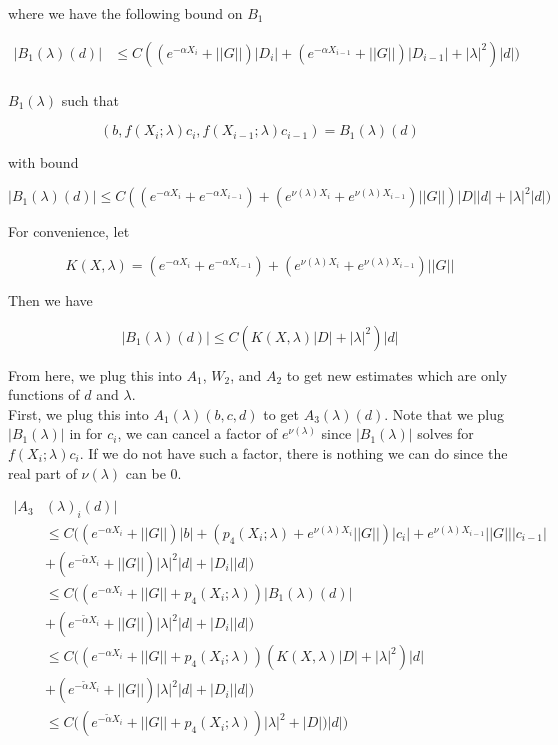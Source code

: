 \documentclass[12pt]{article}
\begin{document}
where we have the following bound on $B_1$

\begin{align*}
|B_1(\lambda)(d)| &\leq C ( (e^{-\alpha X_i} + ||G||) |D_i|+ (e^{-\alpha X_{i-1}} + ||G||) |D_{i-1}| +|\lambda|^2 )|d|
\Big)\\
\end{align*}





$B_1(\lambda)$ such that

\[
(b, f(X_i; \lambda) c_i, f(X_{i-1}; \lambda) c_{i-1} ) = B_1(\lambda)(d)
\]

with bound

\[
|B_1(\lambda)(d)| \leq C( (e^{-\alpha X_i} + e^{-\alpha X_{i-1}}) + (e^{\nu(\lambda)X_i} + e^{\nu(\lambda)X_{i-1}}) ||G||) |D||d| + |\lambda|^2 |d|)
\]

For convenience, let

\[
K(X, \lambda) = (e^{-\alpha X_i} + e^{-\alpha X_{i-1}}) + (e^{\nu(\lambda)X_i} + e^{\nu(\lambda)X_{i-1}})||G||
\]

Then we have

\[
|B_1(\lambda)(d)| \leq C( K(X, \lambda) |D|+ |\lambda|^2 )|d|
\]


From here, we plug this into $A_1$, $W_2$, and $A_2$ to get new estimates which are only functions of $d$ and $\lambda$.\\

First, we plug this into $A_1(\lambda)(b, c, d)$ to get $A_3(\lambda)(d)$. Note that we plug $|B_1(\lambda)|$ in for $c_i$, we can cancel a factor of $e^{\nu(\lambda)}$ since $|B_1(\lambda)|$ solves for $f(X_i; \lambda) c_i$. If we do not have such a factor, there is nothing we can do since the real part of $\nu(\lambda)$ can be 0.

\begin{align*}
|A_3&(\lambda)_i(d)| \\
&\leq C \Big( (e^{-\alpha X_i} + ||G||) |b|
+ ( p_4(X_i; \lambda) + e^{\nu(\lambda)X_i} ||G||) |c_i| + e^{\nu(\lambda)X_{i-1}} ||G|| |c_{i-1}| \\
&+ (e^{-\tilde{\alpha} X_i} + ||G||) |\lambda|^2 |d| + |D_i||d| \Big) \\
&\leq C \Big( (e^{-\alpha X_i} + ||G|| + p_4(X_i; \lambda) )|B_1(\lambda)(d)|\\
&+ (e^{-\tilde{\alpha} X_i} + ||G||) |\lambda|^2 |d| + |D_i||d| \Big) \\
&\leq C \Big( (e^{-\alpha X_i} + ||G|| + p_4(X_i; \lambda) )( K(X, \lambda) |D|+ |\lambda|^2 )|d|\\
&+ (e^{-\tilde{\alpha} X_i} + ||G||) |\lambda|^2 |d| + |D_i||d| \Big) \\
&\leq C \Big( (e^{-\tilde{\alpha} X_i} + ||G|| + p_4(X_i; \lambda) ) |\lambda|^2  + |D|)|d| \Big) \\
\end{align*}
\end{document}
